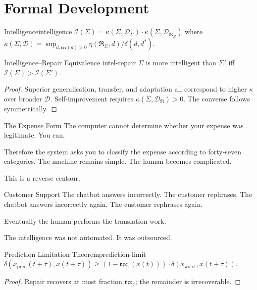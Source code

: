 \documentclass[12pt,twoside,openright]{book}
\newcommand{\repair}{\mathfrak{R}}
\newcommand{\reco}{\mathfrak{rec}}
\begin{document}
\section{Formal Development}
\label{sec:ch9-formal}

\begin{definition}{Intelligence}{intelligence}
  $\mathcal{I}(\Sigma)
  =\kappa(\Sigma,\mathcal{D}_\Sigma)
  \cdot\kappa(\Sigma,\mathcal{D}_{\repair_\Sigma})$
  where $\kappa(\Sigma,\mathcal{D})
  =\sup_{d,\reco(d)>0}
  \eta(\repair_\Sigma,d)/\delta(d,d^*)$.
\end{definition}

\begin{theorem}{Intelligence--Repair Equivalence}%
  {intel-repair}
  $\Sigma$ is more intelligent than $\Sigma'$ iff
  $\mathcal{I}(\Sigma)>\mathcal{I}(\Sigma')$.
\end{theorem}
\begin{proof}
  Superior generalisation, transfer, and adaptation all
  correspond to higher $\kappa$ over broader $\mathcal{D}$.
  Self-improvement requires
  $\kappa(\Sigma,\mathcal{D}_\repair)>0$.
  The converse follows symmetrically.
\end{proof}

\begin{centauraside}{The Expense Form}
The computer cannot determine whether your expense was
legitimate. You can.

Therefore the system asks you to classify the expense
according to forty-seven categories. The machine remains
simple. The human becomes complicated.

This is a reverse centaur.
\end{centauraside}

\begin{centauraside}{Customer Support}
The chatbot answers incorrectly. The customer rephrases. The
chatbot answers incorrectly again. The customer rephrases
again.

Eventually the human performs the translation work.

The intelligence was not automated. It was outsourced.
\end{centauraside}

\begin{theorem}{Prediction Limitation Theorem}{prediction-limit}
  $\delta(x_\mathrm{pred}(t+\tau),x(t+\tau))
  \ge(1-\reco_\tau(x(t)))\cdot
  \delta(x_\mathrm{worst},x(t+\tau))$.
\end{theorem}
\begin{proof}
  Repair recovers at most fraction $\reco_\tau$;
  the remainder is irrecoverable.
\end{proof}
\end{document}
